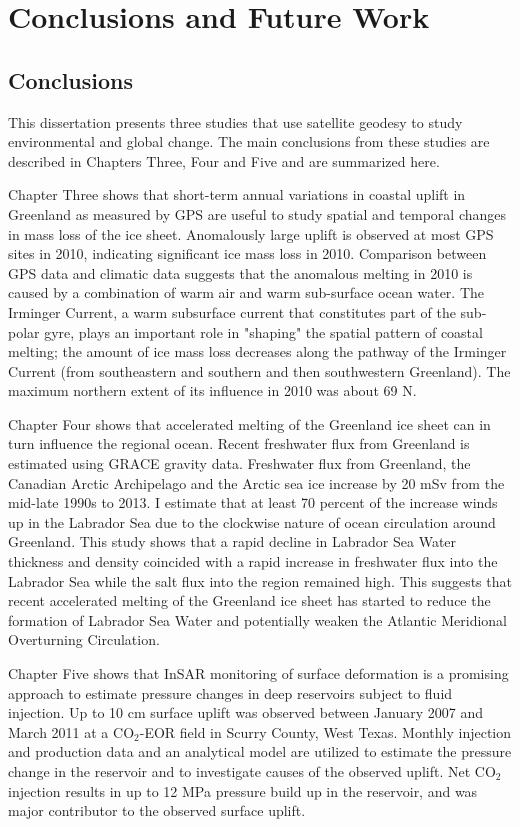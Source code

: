 \chapter{Conclusions and Future Work}
\section{Conclusions}
This dissertation presents three studies that use satellite geodesy to study environmental and global change.  The main conclusions from these studies are described in Chapters Three, Four and Five and are summarized here. 

Chapter Three shows that short-term annual variations in coastal uplift in Greenland as measured by GPS are useful to study spatial and temporal changes in mass loss of the ice sheet.  Anomalously large uplift is observed at most GPS sites in 2010, indicating significant ice mass loss in 2010.  Comparison between GPS data and climatic data suggests that the anomalous melting in 2010 is caused by a combination of warm air and warm sub-surface ocean water.  The Irminger Current, a warm subsurface current that constitutes part of the sub-polar gyre, plays an important role in "shaping" the spatial pattern of coastal melting; the amount of ice mass loss decreases along the pathway of the Irminger Current (from southeastern and southern and then southwestern Greenland).  The maximum northern extent of its influence in 2010 was about 69 \textordmasculine N.  

Chapter Four shows that accelerated melting of the Greenland ice sheet can in turn influence the regional ocean.  Recent freshwater flux from Greenland is estimated using GRACE gravity data.  Freshwater flux from Greenland, the Canadian Arctic Archipelago and the Arctic sea ice increase by 20 mSv from the mid-late 1990s to 2013.  I estimate that at least 70 percent of the increase winds up in the Labrador Sea due to the clockwise nature of ocean circulation around Greenland.  This study shows that a rapid decline in Labrador Sea Water thickness and density coincided with a rapid increase in freshwater flux into the Labrador Sea while the salt flux into the region remained high.  This suggests that recent accelerated melting of the Greenland ice sheet has started to reduce the formation of Labrador Sea Water and potentially weaken the Atlantic Meridional Overturning Circulation. 

Chapter Five shows that InSAR monitoring of surface deformation is a promising approach to estimate pressure changes in deep reservoirs subject to fluid injection.  Up to 10 cm surface uplift was observed between January 2007 and March 2011 at a CO$_{2}$-EOR field in Scurry County, West Texas. Monthly injection and production data and an analytical model are utilized to estimate the pressure change in the reservoir and to investigate causes of the observed uplift. Net CO$_{2}$ injection results in up to 12 MPa pressure build up in the reservoir, and was major contributor to the observed surface uplift.
 
